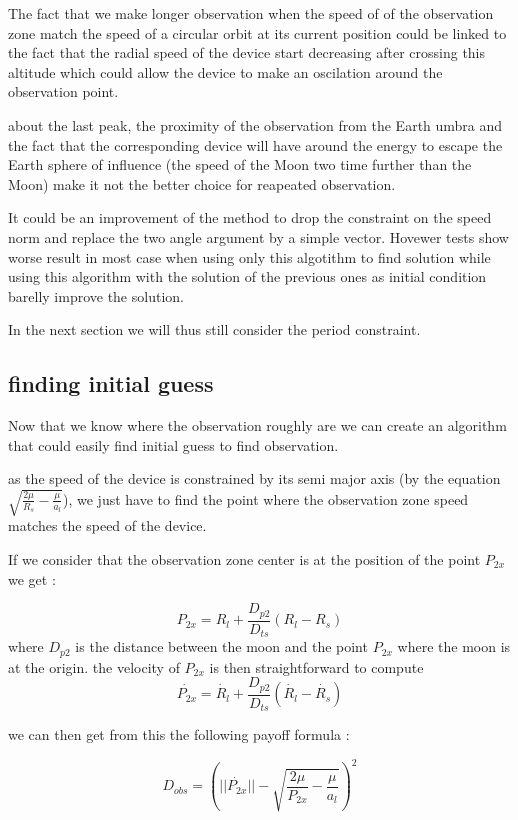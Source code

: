 \documentclass[11pt]{article} %
\begin{document}
		The fact that we make longer observation when the speed of of the observation zone match the speed of a circular orbit at its current position could be linked to the fact that the radial speed of the device start decreasing after crossing this altitude which could allow the device to make an oscilation around the observation point.
		
		about the last peak, the proximity of the observation from the Earth umbra and the fact that the corresponding device will have around the energy to escape the Earth sphere of influence (the speed of the Moon two time further than the Moon) make it not the better choice for reapeated observation.
		
		It could be an improvement of the method to drop the constraint on the speed norm and replace the two angle argument by a simple vector. Hovewer tests show worse result in most case when using only this algotithm to find solution while using this algorithm with the solution of the previous ones as initial condition barelly improve the solution.
		
		In the next section we will thus still consider the period constraint. 
		
		\subsection{finding initial guess}
		
		Now that we know where the observation roughly are we can create an algorithm that could easily find initial guess to find observation.
		
		as the speed of the device is constrained by its semi major axis (by the equation $\sqrt{\frac{2\mu}{R_s}-\frac{\mu}{a_l}}$), we just have to find the point where the observation zone speed matches the speed of the device.
			
		If we consider that the observation zone center is at the position of the point $P_{2x}$ we get :
		
		$$
		P_{2x}=R_l+\frac{D_{p2}}{D_{ts}}(R_l-R_s)
		$$
		where $D_{p2}$ is the distance between the moon and the point $P_{2x}$ where the moon is at the origin.
		the velocity of $P_{2x}$ is then straightforward to compute
		$$
		\dot{P_{2x}}=\dot{R_l}+\frac{D_{p2}}{D_{ts}}(\dot{R_l}-\dot{R_s})
		$$
		
		we can then get from this the following payoff formula :
		
		$$
		D_{obs}=\left(||\dot{P_{2x}}||-\sqrt{\frac{2\mu}{P_{2x}}-\frac{\mu}{a_l}}\right)^2
		$$  
		
\end{document}
